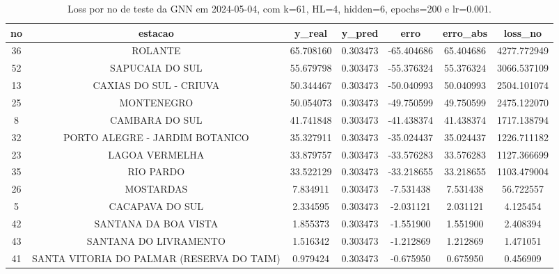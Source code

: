 \begin{table}[h]
\centering
\caption{Loss por no de teste da GNN em 2024-05-04, com k=61, HL=4, hidden=6, epochs=200 e lr=0.001.}
\label{tab:gnn_loss_k61_hl4_h6_e200_d20240504}
\begin{tabular}{ccccccc}
\toprule
no & estacao & y\_real & y\_pred & erro & erro\_abs & loss\_no \\
\midrule
36 & ROLANTE & 65.708160 & 0.303473 & -65.404686 & 65.404686 & 4277.772949 \\
52 & SAPUCAIA DO SUL & 55.679798 & 0.303473 & -55.376324 & 55.376324 & 3066.537109 \\
13 & CAXIAS DO SUL - CRIUVA & 50.344467 & 0.303473 & -50.040993 & 50.040993 & 2504.101074 \\
25 & MONTENEGRO & 50.054073 & 0.303473 & -49.750599 & 49.750599 & 2475.122070 \\
8 & CAMBARA DO SUL & 41.741848 & 0.303473 & -41.438374 & 41.438374 & 1717.138794 \\
32 & PORTO ALEGRE - JARDIM BOTANICO & 35.327911 & 0.303473 & -35.024437 & 35.024437 & 1226.711182 \\
23 & LAGOA VERMELHA & 33.879757 & 0.303473 & -33.576283 & 33.576283 & 1127.366699 \\
35 & RIO PARDO & 33.522129 & 0.303473 & -33.218655 & 33.218655 & 1103.479004 \\
26 & MOSTARDAS & 7.834911 & 0.303473 & -7.531438 & 7.531438 & 56.722557 \\
5 & CACAPAVA DO SUL & 2.334595 & 0.303473 & -2.031121 & 2.031121 & 4.125454 \\
42 & SANTANA DA BOA VISTA & 1.855373 & 0.303473 & -1.551900 & 1.551900 & 2.408394 \\
43 & SANTANA DO LIVRAMENTO & 1.516342 & 0.303473 & -1.212869 & 1.212869 & 1.471051 \\
41 & SANTA VITORIA DO PALMAR (RESERVA DO TAIM) & 0.979424 & 0.303473 & -0.675950 & 0.675950 & 0.456909 \\
\bottomrule
\end{tabular}
\end{table}
